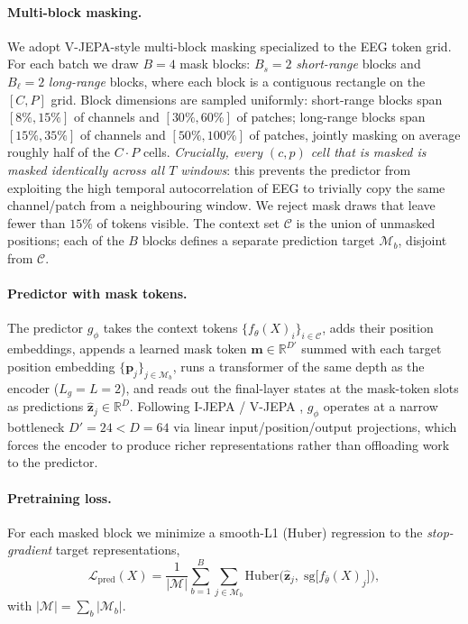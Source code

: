 \paragraph{Multi-block masking.}
We adopt V-JEPA-style multi-block masking \citep{bardes2024vjepa}
specialized to the EEG token grid. For each batch we draw $B = 4$ mask
blocks: $B_s = 2$ \emph{short-range} blocks and $B_\ell = 2$
\emph{long-range} blocks, where each block is a contiguous rectangle
on the $[C, P]$ grid. Block dimensions are sampled uniformly:
short-range blocks span $[8\%, 15\%]$ of channels and $[30\%, 60\%]$
of patches; long-range blocks span $[15\%, 35\%]$ of channels and
$[50\%, 100\%]$ of patches, jointly masking on average roughly half of
the $C \cdot P$ cells. \emph{Crucially, every $(c, p)$ cell that is
masked is masked identically across all $T$ windows}: this prevents
the predictor from exploiting the high temporal autocorrelation of
EEG to trivially copy the same channel/patch from a neighbouring
window. We reject mask draws that leave fewer than $15\%$ of tokens
visible. The context set $\mathcal{C}$ is the union of unmasked
positions; each of the $B$ blocks defines a separate prediction target
$\mathcal{M}_b$, disjoint from $\mathcal{C}$.

\paragraph{Predictor with mask tokens.}
The predictor $g_\phi$ takes the context tokens
$\{f_\theta(X)_i\}_{i \in \mathcal{C}}$, adds their position
embeddings, appends a learned mask token $\mathbf{m} \in
\mathbb{R}^{D'}$ summed with each target position embedding
$\{\mathbf{p}_j\}_{j \in \mathcal{M}_b}$, runs a transformer of the
same depth as the encoder ($L_g = L = 2$), and reads out the
final-layer states at the mask-token slots as predictions
$\hat{\mathbf{z}}_j \in \mathbb{R}^{D}$. Following I-JEPA / V-JEPA
\citep{assran2023ijepa,bardes2024vjepa}, $g_\phi$ operates at a
narrow bottleneck $D' = 24 < D = 64$ via linear input/position/output
projections, which forces the encoder to produce richer
representations rather than offloading work to the predictor.

\paragraph{Pretraining loss.}
For each masked block we minimize a smooth-L1 (Huber) regression to
the \emph{stop-gradient} target representations,
\begin{equation}
  \mathcal{L}_{\text{pred}}(X)
   = \frac{1}{|\mathcal{M}|}
     \sum_{b=1}^{B} \sum_{j \in \mathcal{M}_b}
     \mathrm{Huber}\!\Big(\hat{\mathbf{z}}_j,\;
                          \mathrm{sg}\big[f_{\bar\theta}(X)_j\big]\Big),
  \label{eq:pred-loss}
\end{equation}
with $|\mathcal{M}| = \sum_b |\mathcal{M}_b|$.

